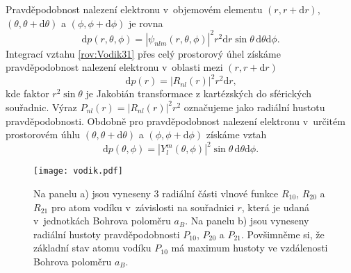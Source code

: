 Pravděpodobnost nalezení elektronu v~objemovém elementu $(r, r+ \mathrm{d}r)$, $(\theta,\theta+\mathrm{d}\theta)$ a $(\phi, \phi + \mathrm{d}\phi)$ je rovna
\begin{equation}
\mathrm{d}p (r, \theta, \phi) = |\psi_{nlm}(r, \theta, \phi)|^2 r^2 \mathrm{d}r \sin \theta \,\mathrm{d}\theta \mathrm{d}\phi \mbox{.}
\label{rov:Vodik31}
\end{equation} 
Integrací vztahu \eqref{rov:Vodik31} přes celý prostorový úhel získáme pravděpodobnost nalezení elektronu v~oblasti mezi $(r, r+ \mathrm{d}r)$
\begin{equation}
\mathrm{d}p (r) = |R_{nl}(r)|^2 r^2 \mathrm{d}r \mbox{,}
\label{rov:Vodik32}
\end{equation}
kde faktor $r^2 \sin \theta$ je Jakobián transformace z kartézských do sférických souřadnic. Výraz $P_{nl}(r)=|R_{nl}(r)|^2 r^2$ označujeme jako radiální hustotu pravděpodobnosti. Obdobně pro pravděpodobnost nalezení elektronu v~určitém prostorovém úhlu $(\theta,\theta+\mathrm{d}\theta)$ a $(\phi, \phi + \mathrm{d}\phi)$ získáme vztah
\begin{equation}
\mathrm{d}p (\theta, \phi) = |Y_{l}^m(\theta, \phi)|^2 \sin \theta \,\mathrm{d}\theta \mathrm{d}\phi \mbox{.}
\end{equation}
\begin{figure} [!ht]
\centering
\texttt{[image: vodik.pdf]}
\caption[Radiální část vlnové funkce]{Na panelu a) jsou vyneseny 3 radiální části vlnové funkce $R_{10}$, $R_{20}$ a $R_{21}$ pro atom vodíku v~závislosti na souřadnici $r$, která je udaná v~jednotkách Bohrova poloměru $a_B$. Na panelu b) jsou vyneseny radiální hustoty pravděpodobnosti $P_{10}$, $P_{20}$ a $P_{21}$. Povšimněme si, že základní stav atomu vodíku $P_{10}$ má maximum hustoty ve vzdálenosti Bohrova poloměru $a_B$.}
\label{obr:RadialniFunkceVodik}
\end{figure}